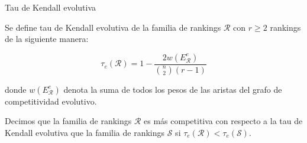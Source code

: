 \documentclass[10pt,hyperref={unicode}]{beamer}
\begin{document}
%			
%			
%		
	
	\begin{frame}{Tau de Kendall evolutiva}
		\begin{defi}
			Se define tau de Kendall evolutiva de la familia de rankings $\mathcal{R}$ con $r \geq 2$ rankings de la siguiente manera:
			
			\begin{equation}
			\tau_e(\mathcal{R}) = 1 - \dfrac{2 w(E_\mathcal{R}^e)}{\binom{n}{2}(r-1)}
			\end{equation} 
			
			donde $w(E_\mathcal{R}^e)$ denota la suma de todos los pesos de las aristas del grafo de competitividad evolutivo.
		\end{defi}
		
		\begin{defi}
			Decimos que la familia de rankings $\mathcal{R}$ es más competitiva con respecto a la tau de Kendall evolutiva que la familia de rankings $\mathcal{S}$ si $\tau_e(\mathcal{R}) < \tau_e(\mathcal{S})$.
		\end{defi}
	\end{frame}
	
\end{document}

